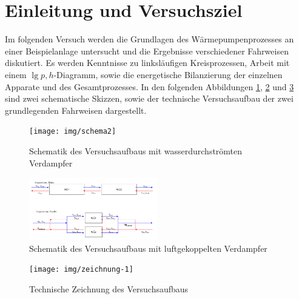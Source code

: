 \section{Einleitung und Versuchsziel}
\label{sec:aufgabenstellung}

Im folgenden Versuch werden die Grundlagen des Wärmepumpenprozesses an einer Beispielanlage untersucht und die Ergebnisse verschiedener Fahrweisen diskutiert. Es werden Kenntnisse zu linksläufigen Kreisprozessen, Arbeit mit einem $\lg{p}, h$-Diagramm, sowie die energetische Bilanzierung der einzelnen Apparate und des Gesamtprozesses.
In den folgenden Abbildungen \ref{fig:schema1}, \ref{fig:schema2} und \ref{fig:tech_zeichnung} sind zwei schematische Skizzen, sowie der technische Versuchsaufbau der zwei grundlegenden Fahrweisen dargestellt.

\begin{figure}[h!]
	\centering
	\texttt{[image: img/schema2]}
	\caption{Schematik des Versuchsaufbaus mit wasserdurchströmten Verdampfer}
	\label{fig:schema1}
\end{figure}
\FloatBarrier

\begin{figure}[h!]
	\centering
	\includegraphics[width=0.5\textwidth]{img/schema1}
	\caption{Schematik des Versuchsaufbaus mit luftgekoppelten Verdampfer}
	\label{fig:schema2}
\end{figure}
\FloatBarrier

\begin{figure}[h!]
	\centering
	\texttt{[image: img/zeichnung-1]}
	\caption{Technische Zeichnung des Versuchsaufbaus}
	\label{fig:tech_zeichnung}
\end{figure}
\FloatBarrier


